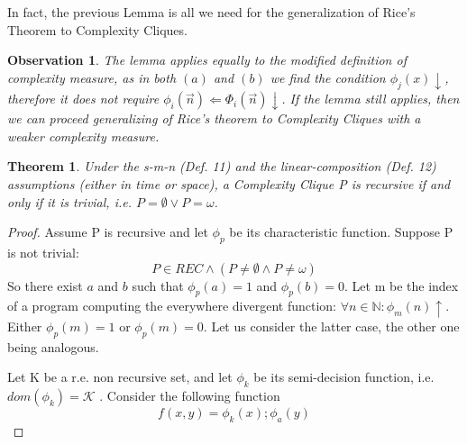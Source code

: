 \documentclass[10pt, a4paper, oneside, titlepage, draft]{article}
\newtheorem{observation}{Observation}[shrd]
\newtheorem{theorem}[shrd]{Theorem}
\begin{document}
In fact, the previous Lemma is all we need for the generalization of Rice's Theorem to Complexity Cliques.

\begin{observation}
    The lemma applies equally to the modified definition of complexity measure, as in both $(a)$ and $(b)$ we find the condition $\phi_j(x)\downarrow$, therefore it does not require $\phi_i(\vec{n}) \Leftarrow \Phi_i(\vec{n})\downarrow$. If the lemma still applies, then we can proceed generalizing of Rice's theorem to Complexity Cliques with a weaker complexity measure.
\end{observation}

\begin{theorem}
    Under the s-m-n (Def. 11) and the linear-composition (Def. 12) assumptions (either in time or space), a Complexity Clique P is recursive if and only if it is trivial, i.e. $P = \emptyset \vee P = \omega$.
\end{theorem}

\begin{proof}
    Assume P is recursive and let $\phi_p$ be its characteristic function. 
    Suppose P is not trivial:
    \begin{equation*}
        P \in REC \wedge (P \neq \emptyset \wedge P \neq \omega)
    \end{equation*}
    So there exist $a$ and $b$ such that $\phi_p(a) = 1$ and $\phi_p(b) = 0$.
    Let m be the index of a program computing the everywhere divergent function: $\forall n \in \mathbb{N} : \phi_m(n) \uparrow$.
    Either $\phi_p(m) = 1$ or $\phi_p(m) = 0$. Let us consider the latter case, the other one being analogous. \par
    Let K be a r.e. non recursive set, and let $\phi_k$ be its semi-decision function, i.e. $dom(\phi_k) = \mathcal{K}$ . Consider the following function
    \begin{equation*}
        f(x,y) = \phi_k(x); \phi_a(y)
    \end{equation*}
\end{proof}
\end{document}
